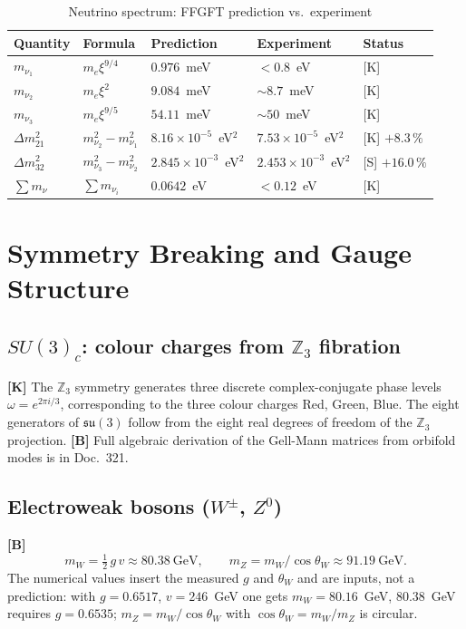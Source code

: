 \begin{table}[h]
\centering
\caption{Neutrino spectrum: FFGFT prediction vs.\ experiment}
\label{tab:neutrinos}
\begin{tabular}{lllll}
\toprule
Quantity & Formula & Prediction & Experiment & Status \\
\midrule
$m_{\nu_1}$ & $m_e\xi^{9/4}$
  & $0.976$~meV & $<0.8$~eV  & [K] \\
$m_{\nu_2}$ & $m_e\xi^2$
  & $9.084$~meV & $\sim8.7$~meV & [K] \\
$m_{\nu_3}$ & $m_e\xi^{9/5}$
  & $54.11$~meV & $\sim50$~meV & [K] \\
$\Delta m_{21}^2$ & $m_{\nu_2}^2-m_{\nu_1}^2$
  & $8.16\times10^{-5}$~eV$^2$ & $7.53\times10^{-5}$~eV$^2$
  & [K] $+8.3\,\%$ \\
$\Delta m_{32}^2$ & $m_{\nu_3}^2-m_{\nu_2}^2$
  & $2.845\times10^{-3}$~eV$^2$ & $2.453\times10^{-3}$~eV$^2$
  & [S] $+16.0\,\%$ \\
$\sum m_\nu$ & $\sum m_{\nu_i}$
  & $0.0642$~eV & $<0.12$~eV & [K] \\
\bottomrule
\end{tabular}
\end{table}

\section{Symmetry Breaking and Gauge Structure}

\subsection{$SU(3)_c$: colour charges from $\mathbb{Z}_3$ fibration}

\textbf{[K]} The $\mathbb{Z}_3$ symmetry generates three discrete
complex-conjugate phase levels $\omega = e^{2\pi i/3}$, corresponding
to the three colour charges Red, Green, Blue. The eight generators of
$\mathfrak{su}(3)$ follow from the eight real degrees of freedom of
the $\mathbb{Z}_3$ projection. \textbf{[B]} Full algebraic derivation
of the Gell-Mann matrices from orbifold modes is in Doc.~321.

\subsection{Electroweak bosons ($W^\pm$, $Z^0$)}

\textbf{[B]}
\begin{equation}
  m_W = \tfrac{1}{2}\,g\,v \approx 80.38~\text{GeV},\qquad
  m_Z = m_W/\!\cos\theta_W \approx 91.19~\text{GeV}.
\end{equation}
The numerical values insert the measured $g$ and $\theta_W$ and are
inputs, not a prediction: with $g = 0.6517$, $v = 246$~GeV one gets
$m_W = 80.16$~GeV, $80.38$~GeV requires $g = 0.6535$;
$m_Z = m_W/\cos\theta_W$ with $\cos\theta_W = m_W/m_Z$ is circular.

